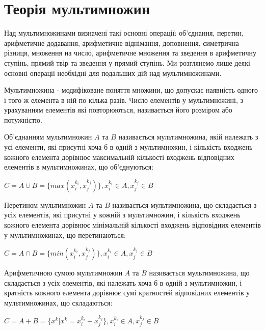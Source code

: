 \section{Теорія мультимножин}

Над мультимножинами визначені такі основні операції: об'єднання, перетин, арифметичне додавання, арифметичне віднімання, доповнення, симетрична різниця, множення на число, арифметичне множення та зведення в арифметичну ступінь, прямий твір та зведення у прямий ступінь. Ми розглянемо лише деякі основні операції необхідні для подальших дій над мультимножинами.

\begin{definition}
Мультимножина - модифіковане поняття множини, що допускає наявність одного і того ж елемента в ній по кілька разів. Число елементів у мультимножині, з урахуванням елементів які повторюються, називається його розміром або потужністю.
\end{definition}

\begin{definition}
Об'єднанням мультимножин $A$ та $B$ називається мультимножина, якій належать з усі елементи, які присутні хоча б в одній з мультимножин, і кількість входжень кожного елемента дорівнює максимальній кількості входжень відповідних елементів в мультимножинах, що об'єднуються:
\begin{center}
$C = A \cup B = \{max(x_i^{k_i}, x_j^{k_j})\}, x_i^{k_i} \in A, x_j^{k_j} \in B$
\end{center}
\end{definition}

\begin{definition}
Перетином мультимножин $A$ та $B$ називається мультимножина, що складається з усіх елементів, які присутні у кожній з мультимножин, і кількість входжень кожного елемента дорівнює мінімальній кількості входжень відповідних елементів у мультимножинах, що перетинаються:
\begin{center}
$C = A \cap B = \{min(x_i^{k_i}, x_j^{k_j})\}, x_i^{k_i} \in A, x_j^{k_j} \in B$
\end{center}
\end{definition}

\begin{definition}
Арифметичною сумою мультимножин $A$ та $B$ називається мультимножина, що складається з усіх елементів, які належать хоча б в одній з мультимножин, і кратність кожного елемента дорівнює сумі кратностей відповідних елементів у мультимножинах, що складаються:
\begin{center}
$C = A + B = \{x^k | x^k = x_i^{k_i} + x_j^{k_j}\}, x_i^{k_i} \in A, x_j^{k_j} \in B$
\end{center}
\end{definition}

